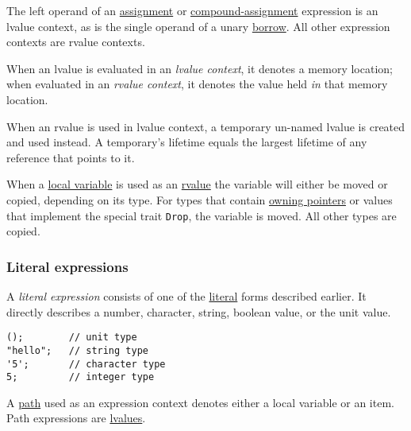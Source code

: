 \documentclass[]{article}
\begin{document}
The left operand of an \hyperref[assignment-expressions]{assignment} or
\hyperref[compound-assignment-expressions]{compound-assignment}
expression is an lvalue context, as is the single operand of a unary
\hyperref[unary-operator-expressions]{borrow}. All other expression
contexts are rvalue contexts.

When an lvalue is evaluated in an \emph{lvalue context}, it denotes a
memory location; when evaluated in an \emph{rvalue context}, it denotes
the value held \emph{in} that memory location.

When an rvalue is used in lvalue context, a temporary un-named lvalue is
created and used instead. A temporary's lifetime equals the largest
lifetime of any reference that points to it.


When a \hyperref[memory-slots]{local variable} is used as an
\hyperref[lvaluesux2c-rvalues-and-temporaries]{rvalue} the variable will
either be moved or copied, depending on its type. For types that contain
\hyperref[pointer-types]{owning pointers} or values that implement the
special trait \texttt{Drop}, the variable is moved. All other types are
copied.

\subsubsection{Literal expressions}\label{literal-expressions}

A \emph{literal expression} consists of one of the
\hyperref[literals]{literal} forms described earlier. It directly
describes a number, character, string, boolean value, or the unit value.

\begin{verbatim}
();        // unit type
"hello";   // string type
'5';       // character type
5;         // integer type
\end{verbatim}


A \hyperref[paths]{path} used as an expression context denotes either a
local variable or an item. Path expressions are
\hyperref[lvaluesux2c-rvalues-and-temporaries]{lvalues}.
\end{document}
